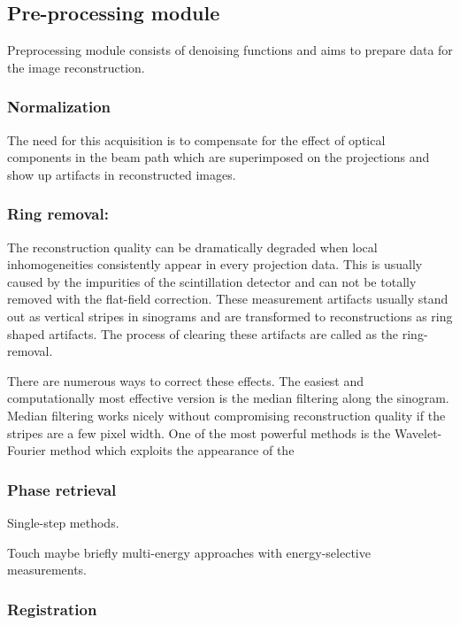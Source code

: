 \documentclass[pdf]{iucr}              %
\begin{document}
\subsection{Pre-processing module}

Preprocessing module consists of denoising functions and aims to prepare data for the image reconstruction.

\subsubsection{Normalization}

The need for this acquisition is to compensate for the effect of optical components in the beam path which are superimposed on the projections and show up artifacts in reconstructed images. 

\subsubsection{Ring removal:}

The reconstruction quality can be dramatically degraded when local inhomogeneities consistently appear in every projection data.  This is usually caused by the impurities of the scintillation detector and can not be totally removed with the flat-field correction. These measurement artifacts usually stand out as vertical stripes in sinograms and are transformed to reconstructions as ring shaped artifacts. The process of clearing these artifacts are called as the ring-removal. 

There are numerous ways to correct these effects. The easiest and computationally most effective version is the median filtering along the sinogram. Median filtering works nicely without compromising reconstruction quality if the stripes are a few pixel width. One of the most powerful methods is the Wavelet-Fourier method which exploits the appearance of the 

\subsubsection{Phase retrieval}

Single-step methods. 

Touch maybe briefly multi-energy approaches with energy-selective measurements.


\subsubsection{Registration}
\end{document}

